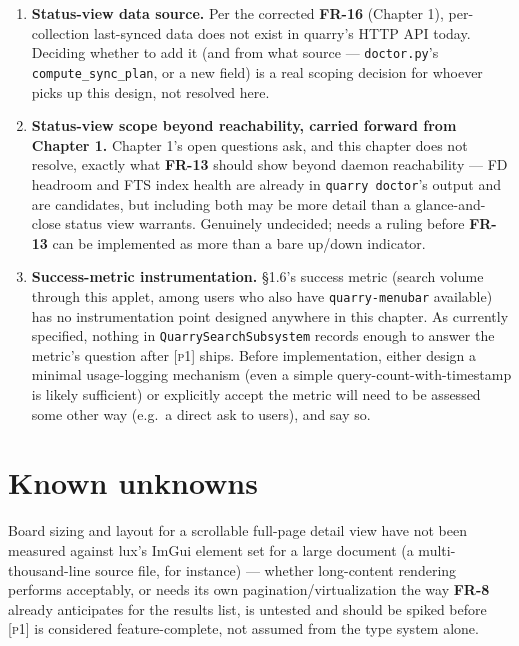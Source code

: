 \documentclass[a4paper,11pt]{report}
\newcommand{\fr}[1]{\textbf{FR-#1}}
\newcommand{\pone}{\textsc{[p1]}}
\begin{document}
\begin{enumerate}
    testing conventions (\texttt{tests/hermetic\_env.py}'s embedding-fake
    pattern) extend cleanly to a second client boundary, or whether this
    needs its own hermeticity mechanism.
  \item \textbf{Status-view data source.} Per the corrected \fr{16}
    (Chapter 1), per-collection last-synced data does not exist in
    quarry's HTTP API today. Deciding whether to add it (and from what
    source --- \texttt{doctor.py}'s \texttt{compute\_sync\_plan}, or a new
    field) is a real scoping decision for whoever picks up this design,
    not resolved here.
  \item \textbf{Status-view scope beyond reachability, carried forward
    from Chapter 1.} Chapter 1's open questions ask, and this chapter
    does not resolve, exactly what \fr{13} should show beyond daemon
    reachability --- FD headroom and FTS index health are already in
    \texttt{quarry doctor}'s output and are candidates, but including
    both may be more detail than a glance-and-close status view
    warrants. Genuinely undecided; needs a ruling before
    \fr{13} can be implemented as more than a bare up/down indicator.
  \item \textbf{Success-metric instrumentation.} \S1.6's success metric
    (search volume through this applet, among users who also have
    \texttt{quarry-menubar} available) has no instrumentation point
    designed anywhere in this chapter. As currently specified, nothing
    in \texttt{QuarrySearchSubsystem} records enough to answer the
    metric's question after \pone{} ships. Before implementation, either
    design a minimal usage-logging mechanism (even a simple
    query-count-with-timestamp is likely sufficient) or explicitly
    accept the metric will need to be assessed some other way (e.g.\ a
    direct ask to users), and say so.
\end{enumerate}

\section{Known unknowns}

Board sizing and layout for a scrollable full-page detail view have not
been measured against lux's ImGui element set for a large document (a
multi-thousand-line source file, for instance) --- whether long-content
rendering performs acceptably, or needs its own pagination/virtualization
the way \fr{8} already anticipates for the results list, is untested and
should be spiked before \pone{} is considered feature-complete, not
assumed from the type system alone.
\end{document}
